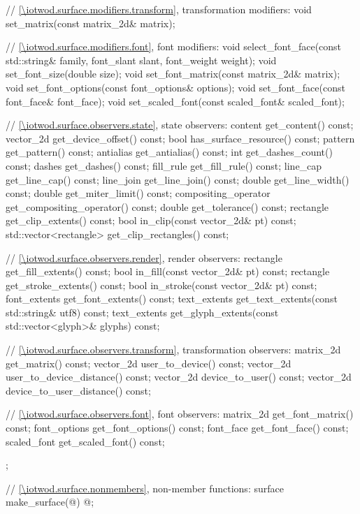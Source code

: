 \begin{codeblock}
{{{{{    // \ref{\iotwod.surface.modifiers.transform}, transformation modifiers:
    void set_matrix(const matrix_2d& matrix);

    // \ref{\iotwod.surface.modifiers.font}, font modifiers:
    void select_font_face(const std::string& family, font_slant slant, 
      font_weight weight);
    void set_font_size(double size);
    void set_font_matrix(const matrix_2d& matrix);
    void set_font_options(const font_options& options);
    void set_font_face(const font_face& font_face);
    void set_scaled_font(const scaled_font& scaled_font);

    // \ref{\iotwod.surface.observers.state}, state observers:
    content get_content() const;
    vector_2d get_device_offset() const;
    bool has_surface_resource() const;
    pattern get_pattern() const;
    antialias get_antialias() const;
    int get_dashes_count() const;
    dashes get_dashes() const;
    fill_rule get_fill_rule() const;
    line_cap get_line_cap() const;
    line_join get_line_join() const;
    double get_line_width() const;
    double get_miter_limit() const;
    compositing_operator get_compositing_operator() const;
    double get_tolerance() const;
    rectangle get_clip_extents() const;
    bool in_clip(const vector_2d& pt) const;
    std::vector<rectangle> get_clip_rectangles() const;

    // \ref{\iotwod.surface.observers.render}, render observers:
    rectangle get_fill_extents() const;
    bool in_fill(const vector_2d& pt) const;
    rectangle get_stroke_extents() const;
    bool in_stroke(const vector_2d& pt) const;
    font_extents get_font_extents() const;
    text_extents get_text_extents(const std::string& utf8) const;
    text_extents get_glyph_extents(const std::vector<glyph>& glyphs) const;

    // \ref{\iotwod.surface.observers.transform}, transformation observers:
    matrix_2d get_matrix() const;
    vector_2d user_to_device() const;
    vector_2d user_to_device_distance() const;
    vector_2d device_to_user() const;
    vector_2d device_to_user_distance() const;

    // \ref{\iotwod.surface.observers.font}, font observers:
    matrix_2d get_font_matrix() const;
    font_options get_font_options() const;
    font_face get_font_face() const;
    scaled_font get_scaled_font() const;
  };
  
  // \ref{\iotwod.surface.nonmembers}, non-member functions:
  surface make_surface(@\impdef@) @\impdef@;
} } } }
\end{codeblock}

